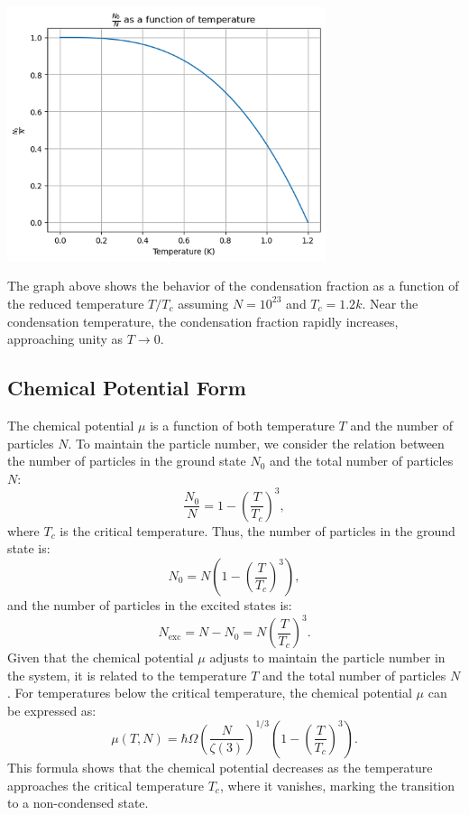 \documentclass{article}
\numberwithin{equation}{section}
\numberwithin{equation}{subsection}
\begin{document}
\begin{center}
    \includegraphics[width=0.7\textwidth]{N_0N_graph_high_quality.png}  
\end{center}
The graph above shows the behavior of the condensation fraction as a function of the reduced temperature \( T/T_c \) assuming $N = 10^{23}$ and $T_c = 1.2k$. Near the condensation temperature, the condensation fraction rapidly increases, approaching unity as \( T \to 0 \). 

\subsection{Chemical Potential Form}

The chemical potential \(\mu\) is a function of both temperature \(T\) and the number of particles \(N\). To maintain the particle number, we consider the relation between the number of particles in the ground state \(N_0\) and the total number of particles \(N\):
\[
\frac{N_0}{N} = 1 - \left(\frac{T}{T_c}\right)^3,
\]
where \(T_c\) is the critical temperature. Thus, the number of particles in the ground state is:
\[
N_0 = N \left( 1 - \left(\frac{T}{T_c}\right)^3 \right),
\]
and the number of particles in the excited states is:
\[
N_{\text{exc}} = N - N_0 = N \left( \frac{T}{T_c} \right)^3.
\]
Given that the chemical potential \(\mu\) adjusts to maintain the particle number in the system, it is related to the temperature \(T\) and the total number of particles \(N\). For temperatures below the critical temperature, the chemical potential \(\mu\) can be expressed as:
\[
\mu(T,N) = \hbar \Omega \left( \frac{N}{\zeta(3)} \right)^{1/3} \left( 1 - \left(\frac{T}{T_c}\right)^3 \right).
\]
This formula shows that the chemical potential decreases as the temperature approaches the critical temperature \(T_c\), where it vanishes, marking the transition to a non-condensed state.\\
\end{document}
